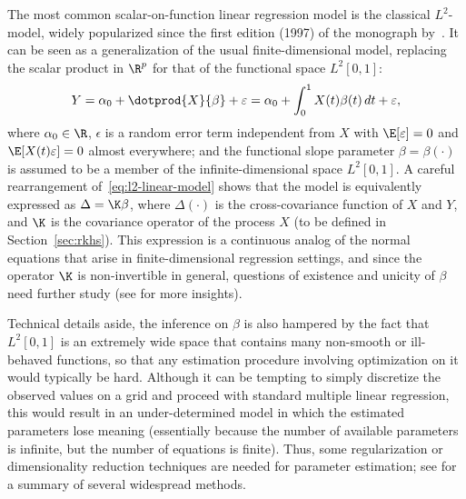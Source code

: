  The most common scalar-on-function linear regression model is the classical \(L^2\)-model, widely popularized since the first edition (1997) of the monograph by~\citet{ramsay2005functional}. It can be seen as a generalization of the usual finite-dimensional model, replacing the scalar product in \(\R^p\) for that of the functional space \(L^2[0,1]\):
\begin{equation}\label{eq:l2-linear-model}
Y = \alpha_0 + \dotprod{X}{\beta} + \epsilon = \alpha_0 + \int_0^1 X(t)\beta(t)\, dt + \epsilon,
\end{equation}
where \(\alpha_0\in \R\), \(\epsilon\) is a random error term independent from \(X\) with \(\E [\epsilon]=0\) and \(\E[X(t)\epsilon]=0\) almost everywhere; and the functional slope parameter \(\beta=\beta(\cdot)\) is assumed to be a member of the infinite-dimensional space \(L^2[0, 1]\). A careful rearrangement of~\eqref{eq:l2-linear-model} shows that the model is equivalently expressed as \(\Delta=\K\beta\), where \(\Delta(\cdot)\) is the cross-covariance function of \(X\) and \(Y\), and \(\K\) is the covariance operator of the process \(X\) (to be defined in Section~\ref{sec:rkhs}). This expression is a continuous analog of the normal equations that arise in finite-dimensional regression settings, and since the operator \(\K\) is non-invertible in general, questions of existence and unicity of \(\beta\) need further study (see \citet{cardot2011functional} for more insights).

Technical details aside, the inference on \(\beta\) is also hampered by the fact that \(L^2[0,1]\) is an extremely wide space that contains many non-smooth or ill-behaved functions, so that any estimation procedure involving optimization on it would typically be hard.
Although it can be tempting to simply discretize the observed values on a grid and proceed with standard multiple linear regression, this would result in an under-determined model in which the estimated parameters lose meaning (essentially because the number of available parameters is infinite, but the number of equations is finite). Thus, some regularization or dimensionality reduction techniques are needed for parameter estimation; see \citet{reiss2017methods} for a summary of several widespread methods.

